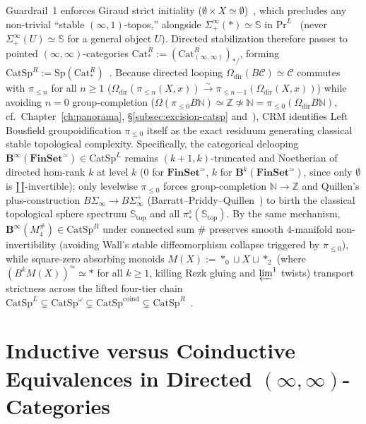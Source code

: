 \documentclass[10pt,twoside,openright]{book}
\theoremstyle{crmplain}
\theoremstyle{crmdef}
\theoremstyle{crmremark}
\begin{document}
Guardrail~1 enforces Giraud strict initiality ($\emptyset \times X \simeq \emptyset$)~\cite[Thm.~6.1.0.6, \S 6.1.1]{Lurie09}, which precludes any non-trivial ``stable $(\infty,1)$-topos,'' alongside $\Sigma^\infty_+(*) \simeq \mathbb{S}$ in $\mathrm{Pr}^L$~\cite[\S\S 1.4.4, 4.8.2]{Lurie17} (never $\Sigma^\infty_+(U) \simeq \mathbb{S}$ for a general object $U$). Directed stabilization therefore passes to pointed $(\infty,\infty)$-categories $\mathrm{Cat}^R_* := (\mathrm{Cat}^R_{(\infty,\infty)})_{*/}$, forming $\mathrm{CatSp}^R := \mathrm{Sp}(\mathrm{Cat}^R_*)$~\cite{Masuda26,Heine26}. Because directed looping $\Omega_{\mathrm{dir}}(B\mathcal{C}) \simeq \mathcal{C}$ commutes with $\pi_{\le n}$ for all $n \ge 1$ ($\Omega_{\mathrm{dir}}(\pi_{\le n}(X, x)) \xrightarrow{\sim} \pi_{\le n-1}(\Omega_{\mathrm{dir}}(X, x))$) while avoiding $n = 0$ group-completion ($\Omega(\pi_{\le 0} B\mathbb{N}) \simeq \mathbb{Z} \not\simeq \mathbb{N} = \pi_{\le 0}(\Omega_{\mathrm{dir}} B\mathbb{N})$, cf.\ Chapter~\ref{ch:panorama}, \S\ref{subsec:excision-catsp} and~\cite{Heine26,Geiss26}), $\mathrm{CRM}$ identifies Left Bousfield groupoidification $\pi_{\le 0}$ itself as the exact residuum generating classical stable topological complexity. Specifically, the categorical delooping $\mathbf{B}^\infty(\mathbf{FinSet}^{\simeq}) \in \mathrm{CatSp}^L$ remains $(k+1, k)$-truncated and Noetherian of directed hom-rank $k$ at level $k$ ($0$ for $\mathbf{FinSet}^{\simeq}$, $k$ for $\mathbf{B}^k(\mathbf{FinSet}^{\simeq})$, since only $\emptyset$ is $\amalg$-invertible); only levelwise $\pi_{\le 0}$ forces group-completion $\mathbb{N} \to \mathbb{Z}$ and Quillen's plus-construction $B\Sigma_\infty \to B\Sigma_\infty^+$ (Barratt--Priddy--Quillen~\cite{BarrattPriddy72,Quillen71}) to birth the classical topological sphere spectrum $\mathbb{S}_{\mathrm{top}}$ and all $\pi_*^s(\mathbb{S}_{\mathrm{top}})$. By the same mechanism, $\mathbf{B}^\infty(M_4^\#) \in \mathrm{CatSp}^R$ under connected sum $\#$ preserves smooth $4$-manifold non-invertibility (avoiding Wall's stable diffeomorphism collapse triggered by $\pi_{\le 0}$), while square-zero absorbing monoids $M(X) := *_0 \sqcup X \sqcup *_2$ (where $(B^k M(X))^{\simeq} \simeq *$ for all $k \ge 1$, killing Rezk gluing and $\varprojlim^1$ twists) transport strictness across the lifted four-tier chain $\mathrm{CatSp}^L \subsetneq \mathrm{CatSp}^\omega \subsetneq \mathrm{CatSp}^{\mathrm{coind}} \subsetneq \mathrm{CatSp}^R$~\cite{ORW26,GepnerHeine26}.

\section{\texorpdfstring{Inductive versus Coinductive Equivalences in Directed $(\infty, \infty)$-Categories}{Inductive versus Coinductive Equivalences in Directed (infinity, infinity)-Categories}}\label{subsec:directed-inf-inf}
\end{document}
